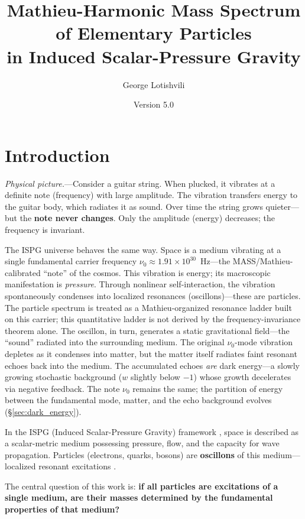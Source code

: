 \documentclass[11pt]{article}
\title{Mathieu-Harmonic Mass Spectrum of Elementary Particles\\
in Induced Scalar-Pressure Gravity}
\author{George Lotishvili}
\date{Version 5.0}
\begin{document}
\maketitle

\section*{Introduction}

\textit{Physical picture.}---Consider a guitar string.
When plucked, it vibrates at a definite note
(frequency) with large amplitude. The vibration
transfers energy to the guitar body, which radiates
it as sound. Over time the string grows quieter---but
the \textbf{note never changes}. Only the amplitude
(energy) decreases; the frequency is invariant.

The ISPG universe behaves the same way. Space is a
medium vibrating at a single fundamental carrier frequency
$\nu_0 \approx 1.91 \times 10^{30}$~Hz---the
MASS/Mathieu-calibrated ``note'' of the cosmos.
This vibration is energy;
its macroscopic manifestation is \emph{pressure}.
Through nonlinear self-interaction, the vibration
spontaneously condenses into localized resonances
(oscillons)---these are particles. The particle
spectrum is treated as a Mathieu-organized resonance
ladder built on this carrier; this quantitative ladder is
not derived by the frequency-invariance theorem alone.
The oscillon, in turn, generates a static gravitational
field---the ``sound'' radiated into the surrounding
medium. The original $\nu_0$-mode vibration
depletes as it condenses into matter, but the
matter itself radiates faint resonant echoes back
into the medium. The accumulated echoes \emph{are}
dark energy---a slowly growing stochastic
background ($w$ slightly below $-1$) whose growth
decelerates via negative feedback. The note $\nu_0$
remains the same; the partition of energy between
the fundamental mode, matter, and the echo
background evolves (\S\ref{sec:dark_energy}).

\medskip

In the ISPG (Induced Scalar-Pressure Gravity) framework
\cite{Lotishvili2026,Lotishvili2026Q,Horndeski1974}, space
is described as a scalar-metric medium possessing pressure, flow,
and the capacity for wave propagation. Particles (electrons, quarks,
bosons) are \textbf{oscillons} of this medium---localized resonant
excitations \cite{Copeland1995,GleiserWatkins1993}.

The central question of this work is: \textbf{if all particles are
excitations of a single medium, are their masses determined by the
fundamental properties of that medium?}
\end{document}

